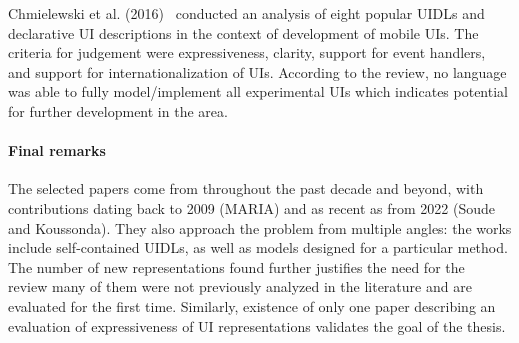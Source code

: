 Chmielewski et al. (2016)~\cite{Chmielewski2016} conducted an analysis of eight popular UIDLs and declarative UI descriptions in the context of development of mobile UIs.
The criteria for judgement were expressiveness, clarity, support for event handlers, and support for internationalization of UIs.
According to the review, no language was able to fully model/implement all experimental UIs which indicates potential for further development in the area.

\paragraph{Final remarks}

The selected papers come from throughout the past decade and beyond, with contributions dating back to 2009 (MARIA) and as recent as from 2022 (Soude and Koussonda).
They also approach the problem from multiple angles: the works include self-contained UIDLs, as well as models designed for a particular method.
The number of new representations found further justifies the need for the review\,\textendash\,many of them were not previously analyzed in the literature and are evaluated for the first time.
Similarly, existence of only one paper describing an evaluation of expressiveness of UI representations validates the goal of the thesis.
